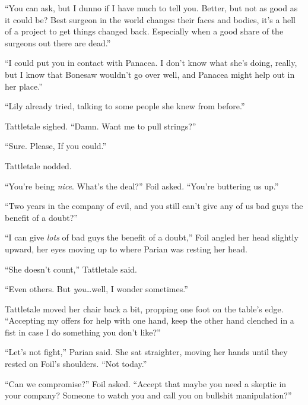 ``You can ask, but I dunno if I have much to tell you.  Better, but not as good as it could be?  Best surgeon in the world changes their faces and bodies, it's a hell of a project to get things changed back.  Especially when a good share of the surgeons out there are dead.''



``I could put you in contact with Panacea.  I don't know what she's doing, really, but I know that Bonesaw wouldn't go over well, and Panacea might help out in her place.''



``Lily already tried, talking to some people she knew from before.''



Tattletale sighed.  ``Damn.  Want me to pull strings?''



``Sure.  Please, If you could.''



Tattletale nodded.



``You're being \emph{nice}.  What's the deal?'' Foil asked.  ``You're buttering us up.''



``Two years in the company of evil, and you still can't give any of us bad guys the benefit of a doubt?''



``I can give \emph{lots} of bad guys the benefit of a doubt,'' Foil angled her head slightly upward, her eyes moving up to where Parian was resting her head.



``She doesn't count,'' Tattletale said.



``Even others.  But \emph{you}\ldots well, I wonder sometimes.''



Tattletale moved her chair back a bit, propping one foot on the table's edge.  ``Accepting my offers for help with one hand, keep the other hand clenched in a fist in case I do something you don't like?''



``Let's not fight,'' Parian said.  She sat straighter, moving her hands until they rested on Foil's shoulders.  ``Not today.''



``Can we compromise?'' Foil asked.  ``Accept that maybe you need a skeptic in your company?  Someone to watch you and call you on bullshit manipulation?''



